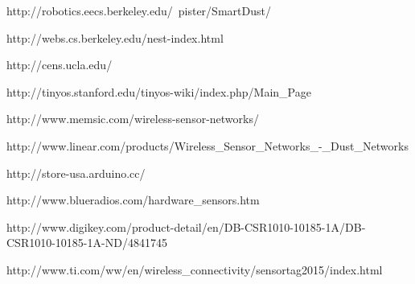 \documentclass[ppfs.tex]{template/subfiles}
\begin{document}
\begin{thebibliography}{10}

http://robotics.eecs.berkeley.edu/~pister/SmartDust/

http://webs.cs.berkeley.edu/nest-index.html

http://cens.ucla.edu/

http://tinyos.stanford.edu/tinyos-wiki/index.php/Main\_Page

http://www.memsic.com/wireless-sensor-networks/

http://www.linear.com/products/Wireless\_Sensor\_Networks\_-\_Dust\_Networks

http://store-usa.arduino.cc/

http://www.blueradios.com/hardware\_sensors.htm

http://www.digikey.com/product-detail/en/DB-CSR1010-10185-1A/DB-CSR1010-10185-1A-ND/4841745

http://www.ti.com/ww/en/wireless\_connectivity/sensortag2015/index.html

\end{thebibliography}
\end{document}

